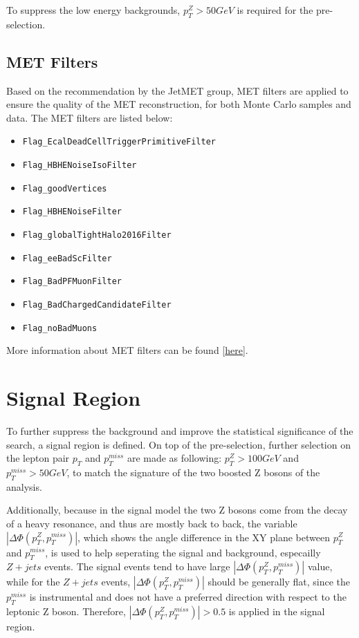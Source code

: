 \vspace{0.3cm}
To suppress the low energy backgrounds, $p_T ^Z > 50GeV$ is required for the pre-selection.


\subsection{MET Filters}\label{sec:metfilter}
Based on the recommendation by the JetMET group, MET filters are applied to ensure the quality of the MET reconstruction, for both Monte Carlo samples and data. The MET filters are listed below:
\begin{itemize}
\item \texttt{Flag\_EcalDeadCellTriggerPrimitiveFilter}
\item \texttt{Flag\_HBHENoiseIsoFilter}
\item \texttt{Flag\_goodVertices}
\item \texttt{Flag\_HBHENoiseFilter}
\item \texttt{Flag\_globalTightHalo2016Filter}
\item \texttt{Flag\_eeBadScFilter}
\item \texttt{Flag\_BadPFMuonFilter}
\item \texttt{Flag\_BadChargedCandidateFilter}
\item \texttt{Flag\_noBadMuons}
\end{itemize} 

More information about MET filters can be found [\href{https://twiki.cern.ch/twiki/bin/viewauth/CMS/MissingETOptionalFiltersRun2?rev=103}{here}].

\section{Signal Region}\label{sec:selection_sr}
To further suppress the background and improve the statistical significance of the search, a signal region is defined. On top of the pre-selection, further selection on the lepton pair $p_T$ and $p_T ^{miss}$ are made as following: $p_T ^Z > 100GeV$ and $p_T ^{miss} > 50GeV$, to match the signature of the two boosted Z bosons of the analysis. 

\vspace{0.3cm}
Additionally, because in the signal model the two Z bosons come from the decay of a heavy resonance, and thus are mostly back to back, the variable $|\Delta \Phi (p_T ^Z ,p_T ^{miss})|$, which shows the angle difference in the XY plane between $p_T ^Z$ and $p_T ^{miss}$, is used to help seperating the signal and background, especailly $Z+jets$ events. The signal events tend to have large $|\Delta \Phi (p_T ^Z ,p_T ^{miss})|$ value, while for the $Z+jets$ events, $|\Delta \Phi (p_T ^Z ,p_T ^{miss})|$ should be generally flat, since the $p_T ^{miss}$ is instrumental and does not have a preferred direction with respect to the leptonic Z boson. Therefore, $|\Delta \Phi (p_T ^Z ,p_T ^{miss})|>0.5$ is applied in the signal region. 

